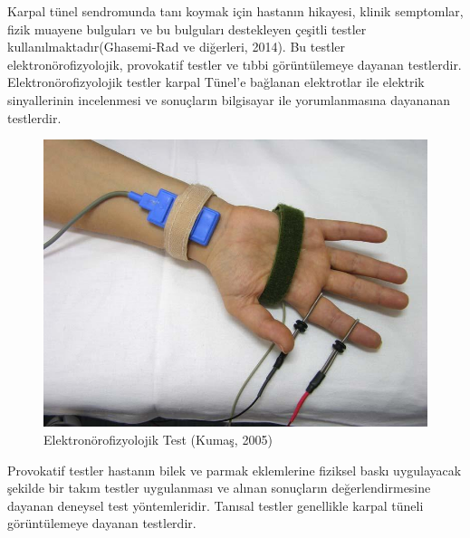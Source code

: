 \documentclass[12pt,twoside]{deuthesis}
\begin{document}
Karpal tünel sendromunda tanı koymak için hastanın hikayesi, klinik semptomlar, fizik muayene bulguları ve bu bulguları destekleyen çeşitli testler kullanılmaktadır(Ghasemi-Rad ve diğerleri, 2014).
Bu testler elektronörofizyolojik, provokatif testler ve tıbbi görüntülemeye dayanan testlerdir.
Elektronörofizyolojik testler karpal Tünel'e bağlanan elektrotlar ile elektrik sinyallerinin incelenmesi ve sonuçların bilgisayar ile yorumlanmasına dayananan testlerdir.

\begin{figure}

{\centering \includegraphics[width=0.49\linewidth,height=0.18\textheight]{figure/noropati_test} 

}

\caption{Elektronörofizyolojik Test (Kumaş, 2005)}\label{fig:unnamed-chunk-2}
\end{figure}
Provokatif testler hastanın bilek ve parmak eklemlerine fiziksel baskı uygulayacak şekilde bir takım
testler uygulanması ve alınan sonuçların değerlendirmesine dayanan deneysel test yöntemleridir.
Tanısal testler genellikle karpal tüneli görüntülemeye dayanan testlerdir.
\end{document}
